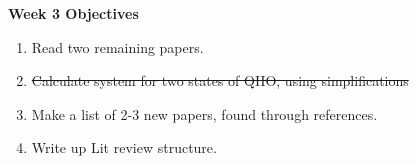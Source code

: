 \documentclass{article}
\begin{document}
\Large{\textbf{Week 3 Objectives}}
\\
\begin{enumerate}
    \item Read two remaining papers.
    \item\sout{Calculate system for two states of QHO, using simplifications}
    \item Make a list of 2-3 new papers, found through references.
    \item Write up Lit review structure.

\end{enumerate}
\end{document}
